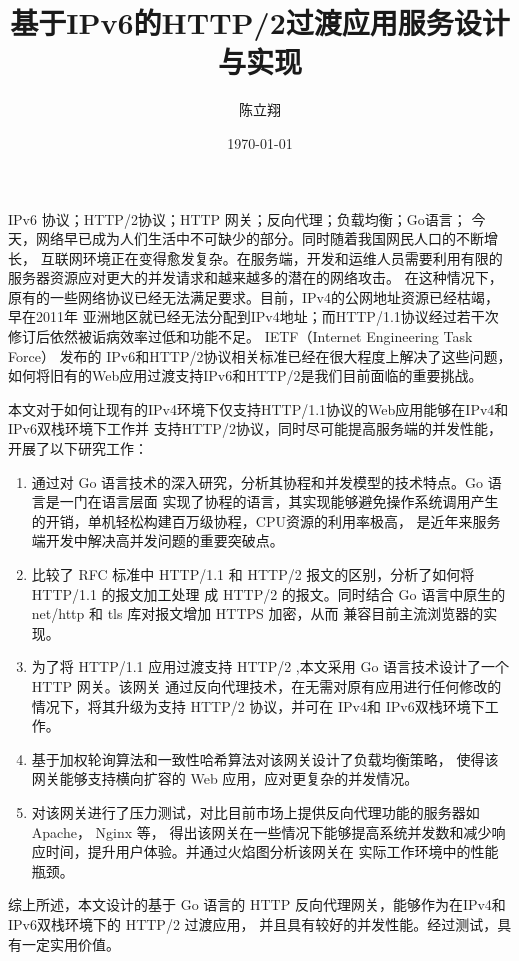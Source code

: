 \documentclass[twoside]{CUGThesis}
\title{基于IPv6的HTTP/2过渡应用服务设计与实现} %
\author{陈立翔} %
\date{\today} %
\begin{document}
	\maketitle
	

	\begin{cnabstract}{IPv6 协议；HTTP/2协议；HTTP 网关；反向代理；负载均衡；Go语言；}
		今天，网络早已成为人们生活中不可缺少的部分。同时随着我国网民人口的不断增长，
	互联网环境正在变得愈发复杂。在服务端，开发和运维人员需要利用有限的服务器资源应对更大的并发请求和越来越多的潜在的网络攻击。
	在这种情况下，原有的一些网络协议已经无法满足要求。目前，IPv4的公网地址资源已经枯竭，早在2011年
	亚洲地区就已经无法分配到IPv4地址；而HTTP/1.1协议经过若干次修订后依然被诟病效率过低和功能不足。
	IETF（Internet Engineering Task Force） 发布的 IPv6和HTTP/2协议相关标准已经在很大程度上解决了这些问题，
	如何将旧有的Web应用过渡支持IPv6和HTTP/2是我们目前面临的重要挑战。\par
		本文对于如何让现有的IPv4环境下仅支持HTTP/1.1协议的Web应用能够在IPv4和IPv6双栈环境下工作并
	支持HTTP/2协议，同时尽可能提高服务端的并发性能，开展了以下研究工作：
	\begin{enumerate}
		\item 通过对 Go 语言技术的深入研究，分析其协程和并发模型的技术特点。Go 语言是一门在语言层面
		实现了协程的语言，其实现能够避免操作系统调用产生的开销，单机轻松构建百万级协程，CPU资源的利用率极高，
		是近年来服务端开发中解决高并发问题的重要突破点。
		\item 比较了 RFC 标准中 HTTP/1.1 和 HTTP/2 报文的区别，分析了如何将 HTTP/1.1 的报文加工处理
		成 HTTP/2 的报文。同时结合 Go 语言中原生的 net/http 和 tls 库对报文增加 HTTPS 加密，从而
		兼容目前主流浏览器的实现。
		\item 为了将 HTTP/1.1 应用过渡支持 HTTP/2 ,本文采用 Go 语言技术设计了一个 HTTP 网关。该网关
		通过反向代理技术，在无需对原有应用进行任何修改的情况下，将其升级为支持 HTTP/2 协议，并可在 IPv4和
		IPv6双栈环境下工作。
		\item 基于加权轮询算法和一致性哈希算法对该网关设计了负载均衡策略，
		使得该网关能够支持横向扩容的 Web 应用，应对更复杂的并发情况。
		\item 对该网关进行了压力测试，对比目前市场上提供反向代理功能的服务器如 Apache， Nginx 等，
		得出该网关在一些情况下能够提高系统并发数和减少响应时间，提升用户体验。并通过火焰图分析该网关在
		实际工作环境中的性能瓶颈。
	\end{enumerate}
		\par
		综上所述，本文设计的基于 Go 语言的 HTTP 反向代理网关，能够作为在IPv4和IPv6双栈环境下的 HTTP/2 过渡应用，
	并且具有较好的并发性能。经过测试，具有一定实用价值。
	\end{cnabstract}
	
\end{document}
